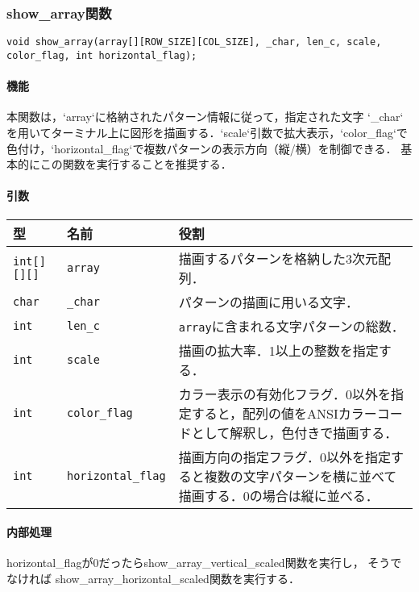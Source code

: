 \documentclass[uplatex]{jsarticle}
\begin{document}
\subsubsection{show\_array関数}
\texttt{void show\_array(array[][ROW\_SIZE][COL\_SIZE], \_char, len\_c, scale, color\_flag, int horizontal\_flag);}
\paragraph{機能}
本関数は，`array`に格納されたパターン情報に従って，指定された文字 `\_char` を用いてターミナル上に図形を描画する．`scale`引数で拡大表示，`color\_flag`で色付け，`horizontal\_flag`で複数パターンの表示方向（縦/横）を制御できる．
基本的にこの関数を実行することを推奨する．

\paragraph{引数}
\begin{center}
    \begin{tabular}{|l|l|p{7.5cm}|}
        \hline
        \textbf{型} & \textbf{名前} & \textbf{役割} \\ \hline
        \texttt{int[][][]} & \texttt{array} & 描画するパターンを格納した3次元配列． \\ \hline
        \texttt{char} & \texttt{\_char} & パターンの描画に用いる文字． \\ \hline
        \texttt{int} & \texttt{len\_c} & \texttt{array}に含まれる文字パターンの総数． \\ \hline
        \texttt{int} & \texttt{scale} & 描画の拡大率．1以上の整数を指定する． \\ \hline
        \texttt{int} & \texttt{color\_flag} & カラー表示の有効化フラグ．0以外を指定すると，配列の値をANSIカラーコードとして解釈し，色付きで描画する． \\ \hline
        \texttt{int} & \texttt{horizontal\_flag} & 描画方向の指定フラグ．0以外を指定すると複数の文字パターンを横に並べて描画する．0の場合は縦に並べる． \\ \hline
    \end{tabular}
\end{center}

\paragraph{内部処理}
horizontal\_flagが0だったらshow\_array\_vertical\_scaled関数を実行し，
そうでなければ
show\_array\_horizontal\_scaled関数を実行する．
\end{document}
